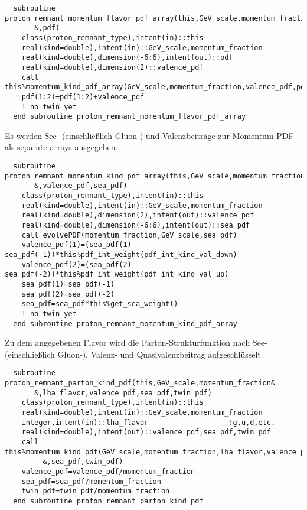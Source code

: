 \begin{Verbatim}
  subroutine proton_remnant_momentum_flavor_pdf_array(this,GeV_scale,momentum_fraction&
       &,pdf)
    class(proton_remnant_type),intent(in)::this
    real(kind=double),intent(in)::GeV_scale,momentum_fraction
    real(kind=double),dimension(-6:6),intent(out)::pdf
    real(kind=double),dimension(2)::valence_pdf
    call this%momentum_kind_pdf_array(GeV_scale,momentum_fraction,valence_pdf,pdf)
    pdf(1:2)=pdf(1:2)+valence_pdf
    ! no twin yet
  end subroutine proton_remnant_momentum_flavor_pdf_array
\end{Verbatim}
Es werden See- (einschließlich Gluon-) und Valenzbeiträge zur Momentum-PDF als separate arrays ausgegeben.
\begin{Verbatim}
  subroutine proton_remnant_momentum_kind_pdf_array(this,GeV_scale,momentum_fraction&
       &,valence_pdf,sea_pdf)
    class(proton_remnant_type),intent(in)::this
    real(kind=double),intent(in)::GeV_scale,momentum_fraction
    real(kind=double),dimension(2),intent(out)::valence_pdf
    real(kind=double),dimension(-6:6),intent(out)::sea_pdf
    call evolvePDF(momentum_fraction,GeV_scale,sea_pdf)
    valence_pdf(1)=(sea_pdf(1)-sea_pdf(-1))*this%pdf_int_weight(pdf_int_kind_val_down)
    valence_pdf(2)=(sea_pdf(2)-sea_pdf(-2))*this%pdf_int_weight(pdf_int_kind_val_up)
    sea_pdf(1)=sea_pdf(-1)
    sea_pdf(2)=sea_pdf(-2)
    sea_pdf=sea_pdf*this%get_sea_weight()
    ! no twin yet
  end subroutine proton_remnant_momentum_kind_pdf_array
\end{Verbatim}
Zu dem angegebenen Flavor wird die Parton-Strukturfunktion nach See- (einschließlich Gluon-), Valenz-  und Quasivalenzbeitrag aufgeschlüsselt.
\begin{Verbatim}
  subroutine proton_remnant_parton_kind_pdf(this,GeV_scale,momentum_fraction&
       &,lha_flavor,valence_pdf,sea_pdf,twin_pdf)
    class(proton_remnant_type),intent(in)::this
    real(kind=double),intent(in)::GeV_scale,momentum_fraction
    integer,intent(in)::lha_flavor                   !g,u,d,etc.
    real(kind=double),intent(out)::valence_pdf,sea_pdf,twin_pdf
    call this%momentum_kind_pdf(GeV_scale,momentum_fraction,lha_flavor,valence_pdf&
         &,sea_pdf,twin_pdf)
    valence_pdf=valence_pdf/momentum_fraction
    sea_pdf=sea_pdf/momentum_fraction
    twin_pdf=twin_pdf/momentum_fraction
  end subroutine proton_remnant_parton_kind_pdf
\end{Verbatim}
